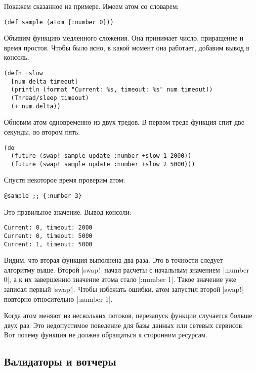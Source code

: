 Покажем сказанное на примере. Имеем атом со словарем:

\begin{verbatim}
(def sample (atom {:number 0}))
\end{verbatim}

Объявим функцию медленного сложения. Она принимает число, приращение и время
простоя. Чтобы было ясно, в какой момент она работает, добавим вывод в консоль.

\begin{verbatim}
(defn +slow
  [num delta timeout]
  (println (format "Current: %s, timeout: %s" num timeout))
  (Thread/sleep timeout)
  (+ num delta))
\end{verbatim}

Обновим атом одновременно из двух тредов. В первом треде функция спит две
секунды, во втором пять:

\begin{verbatim}
(do
  (future (swap! sample update :number +slow 1 2000))
  (future (swap! sample update :number +slow 2 5000)))
\end{verbatim}

Спустя некоторое время проверим атом:

\begin{verbatim}
@sample ;; {:number 3}
\end{verbatim}

Это правильное значение. Вывод консоли:

\begin{verbatim}
Current: 0, timeout: 2000
Current: 0, timeout: 5000
Current: 1, timeout: 5000
\end{verbatim}

Видим, что вторая функция выполнена два раза. Это в точности следует алгоритму
выше. Второй \spverb|swap!| начал расчеты с начальным значением \spverb|{:number 0}|, а к их
завершению значение атома стало \spverb|{:number 1}|. Такое значение уже записал первый
\spverb|swap!|. Чтобы избежать ошибки, атом запустил второй \spverb|swap!| повторно
относительно \spverb|{:number 1}|.

Когда атом меняют из нескольких потоков, перезапуск функции случается больше
двух раз. Это недопустимое поведение для базы данных или сетевых сервисов. Вот
почему функция не должна обращаться к сторонним ресурсам.

\subsection{Валидаторы и вотчеры}

